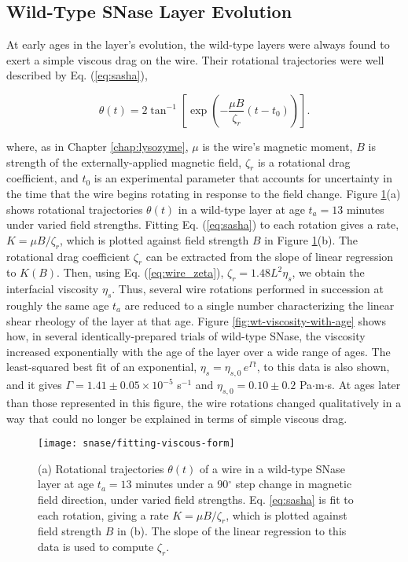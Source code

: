 \subsection{Wild-Type SNase Layer Evolution}

At early ages in the layer's evolution, the wild-type layers were always found to exert a simple viscous drag on the wire. Their rotational trajectories were well described by Eq. (\ref{eq:sasha}),

\begin{equation*}
 \theta(t) = 2 \tan^{-1} \left[ \exp \left( -\frac{\mu B}{\zeta_r} (t-t_0) \right) \right].
\end{equation*}

\noindent where, as in Chapter \ref{chap:lysozyme}, $\mu$ is the wire's magnetic moment, $B$ is strength of the externally-applied magnetic field, $\zeta_r$ is a rotational drag coefficient, and $t_0$ is an experimental parameter that accounts for uncertainty in the time that the wire begins rotating in response to the field change. Figure \ref{fig:fitting-viscous-form}(a) shows rotational trajectories $\theta(t)$ in a wild-type layer at age $t_a=13$ minutes under varied field strengths. Fitting Eq. (\ref{eq:sasha}) to each rotation gives a rate, $K=\mu B/\zeta_r$, which is plotted against field strength $B$ in Figure \ref{fig:fitting-viscous-form}(b). The rotational drag coefficient $\zeta_r$ can be extracted from the slope of linear regression to $K(B)$. Then, using Eq. (\ref{eq:wire_zeta}), $\zeta_r = 1.48 L^2\eta_s$, we obtain the interfacial viscosity $\eta_s$. Thus, several wire rotations performed in succession at roughly the same age $t_a$ are reduced to a single number characterizing the linear shear rheology of the layer at that age. Figure \ref{fig:wt-viscosity-with-age} shows how, in several identically-prepared trials of wild-type SNase, the viscosity increased exponentially with the age of the layer over a wide range of ages. The least-squared best fit of an exponential, $\eta_s=\eta_{s,0}\, e^{\Gamma t}$, to this data is also shown, and it gives $\Gamma=1.41 \pm 0.05 \times 10^{-5}$ s$^{-1}$ and $\eta_{s,0}=0.10 \pm 0.2$ \textmu Pa$\cdot$m$\cdot$s. At ages later than those represented in this figure, the wire rotations changed qualitatively in a way that could no longer be explained in terms of simple viscous drag.

   \begin{figure}
    \centering
    \texttt{[image: snase/fitting-viscous-form]} %
    \caption{\label{fig:fitting-viscous-form}(a) Rotational trajectories $\theta(t)$ of a wire in a wild-type SNase layer at age $t_a=13$ minutes under a 90$^\circ$ step change in magnetic field direction, under varied field strengths. Eq. \ref{eq:sasha} is fit to each rotation, giving a rate $K=\mu B/\zeta_r$, which is plotted against field strength $B$ in (b). The slope of the linear regression to this data is used to compute $\zeta_r$.}
    \end{figure}


